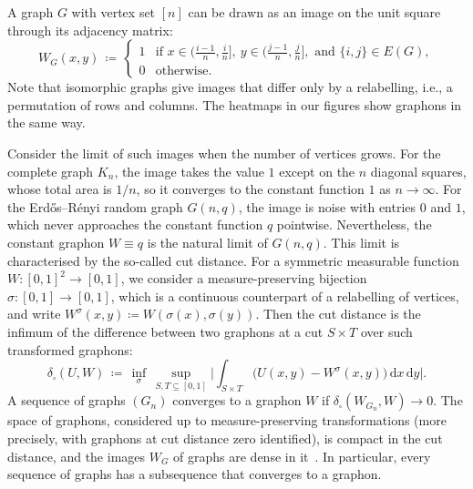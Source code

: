 \documentclass[11pt]{article}
\theoremstyle{plain}
\theoremstyle{definition}
\theoremstyle{remark}
\begin{document}
A graph $G$ with vertex set $[n]$ can be drawn as an image on the unit square through its adjacency matrix:
\[
W_G(x, y) \,\coloneqq\,
\begin{cases}
1 & \text{if } x \in \bigl(\frac{i-1}{n}, \frac{i}{n}\bigr],\ y \in \bigl(\frac{j-1}{n}, \frac{j}{n}\bigr], \text{ and } \{i, j\} \in E(G), \\
0 & \text{otherwise}.
\end{cases}
\] Note that isomorphic graphs give images that differ only by a relabelling, i.e., a permutation of rows and columns. The heatmaps in our figures show graphons in the same way.

Consider the limit of such images when the number of vertices grows. For the complete graph $K_n$, the image takes the value $1$ except on the $n$ diagonal squares, whose total area is $1/n$, so it converges to the constant function $1$ as $n \to \infty$. For the Erd\H{o}s--R\'enyi random graph $G(n, q)$, the image is noise with entries $0$ and $1$, which never approaches the constant function $q$ pointwise. Nevertheless, the constant graphon $W \equiv q$ is the natural limit of $G(n, q)$. This limit is characterised by the so-called cut distance. For a symmetric measurable function $W : [0,1]^2 \to [0,1]$, we consider a measure-preserving bijection $\sigma : [0,1] \to [0,1]$, which is a continuous counterpart of a relabelling of vertices, and write $W^\sigma(x, y) \coloneqq W(\sigma(x), \sigma(y))$. Then the cut distance is the infimum of the difference between two graphons at a cut $S \times T$ over such transformed graphons:
\[
\delta_\square(U, W) \,\coloneqq\, \inf_{\sigma}\, \sup_{S, T \subseteq [0,1]} \biggl| \int_{S \times T} \bigl(U(x, y) - W^\sigma(x, y)\bigr)\, \mathrm{d}x\, \mathrm{d}y \biggr|.
\]
A sequence of graphs $(G_n)$ converges to a graphon $W$ if $\delta_\square(W_{G_n}, W) \to 0$. The space of graphons, considered up to measure-preserving transformations (more precisely, with graphons at cut distance zero identified), is compact in the cut distance, and the images $W_G$ of graphs are dense in it~\citep{lovasz2012large}. In particular, every sequence of graphs has a subsequence that converges to a graphon.
\end{document}
